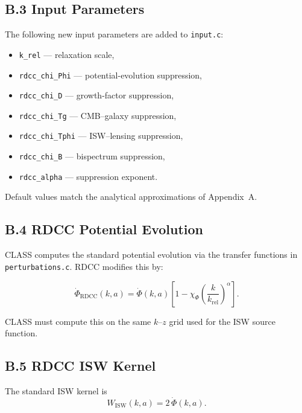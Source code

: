 \documentclass[11pt,a4paper]{article}
\begin{document}
\subsection*{B.3 Input Parameters}

The following new input parameters are added to \texttt{input.c}:

\begin{itemize}
    \item \texttt{k\_rel} — relaxation scale,
    \item \texttt{rdcc\_chi\_Phi} — potential-evolution suppression,
    \item \texttt{rdcc\_chi\_D} — growth-factor suppression,
    \item \texttt{rdcc\_chi\_Tg} — CMB–galaxy suppression,
    \item \texttt{rdcc\_chi\_Tphi} — ISW–lensing suppression,
    \item \texttt{rdcc\_chi\_B} — bispectrum suppression,
    \item \texttt{rdcc\_alpha} — suppression exponent.
\end{itemize}

Default values match the analytical approximations of Appendix~A.

\subsection*{B.4 RDCC Potential Evolution}

CLASS computes the standard potential evolution via the transfer functions in 
\texttt{perturbations.c}. RDCC modifies this by:

\begin{equation}
    \dot{\Phi}_{\mathrm{RDCC}}(k,a)
    = \dot{\Phi}(k,a)
      \left[
        1 - \chi_{\Phi}
        \left(\frac{k}{k_{\mathrm{rel}}}\right)^{\alpha}
      \right].
\end{equation}

CLASS must compute this on the same $k$–$z$ grid used for the ISW source function.

\subsection*{B.5 RDCC ISW Kernel}

The standard ISW kernel is
\begin{equation}
    W_{\mathrm{ISW}}(k,a)
    = 2\,\dot{\Phi}(k,a).
\end{equation}
\end{document}
